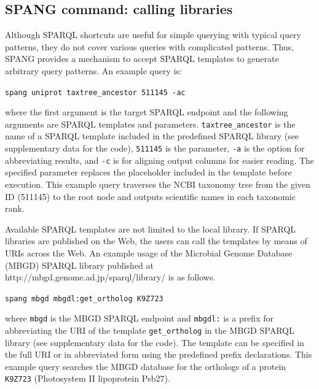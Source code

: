 \documentclass[runningheads]{llncs}
\begin{document}





\subsection{SPANG command: calling libraries}

Although SPARQL shortcuts are useful for simple querying with typical query patterns, they do not cover various
queries with complicated patterns. 
Thus, SPANG provides a mechanism to accept SPARQL templates to generate arbitrary query patterns. 
An example query is: 

\texttt{spang uniprot taxtree\_ancestor 511145 -ac}

\noindent where the first argument is the target SPARQL endpoint and the following arguments are SPARQL templates and parameters. {\tt taxtree\_ancestor} is the name of a SPARQL template included in the predefined SPARQL library (see supplementary data for the code), {\tt 511145} is the parameter, {\tt -a} is the option for abbreviating results, and {\tt -c} is for aligning output columns for easier reading.
The specified parameter replaces the placeholder included in the template before execution. 
This example query traverses the NCBI taxonomy tree from the given ID (511145) to the root node and outputs scientific names in each taxonomic rank.


Available SPARQL templates are not limited to the local library.
If SPARQL libraries are published on the Web, the users can call the templates by means of URIs across the Web.
An example usage of the Microbial Genome Database (MBGD) SPARQL library published at http://mbgd.genome.ad.jp/sparql/library/ is as follows.

\texttt{spang mbgd mbgdl:get\_ortholog K9Z723}

where {\tt mbgd} is the MBGD SPARQL endpoint \citep{Chiba} and \texttt{mbgdl:} is a prefix for abbreviating the URI of the template {\tt get\_ortholog} in the MBGD SPARQL library (see supplementary data for the code). 
The template can be specified in the full URI or in abbreviated form using the predefined prefix declarations.
This example query searches the MBGD database \citep{Uchiyama} for the orthologs of a protein \texttt{K9Z723} (Photosystem II lipoprotein Psb27).
\end{document}
